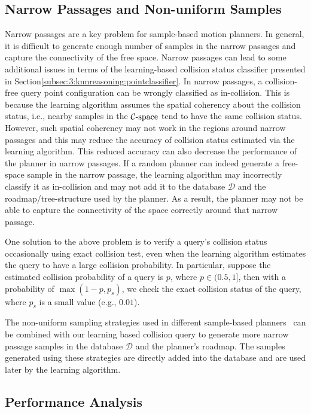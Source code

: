 \subsection{Narrow Passages and Non-uniform Samples}
\label{subsec:3:narrowpassage}
Narrow passages are a key problem for sample-based motion planners. In general, it is difficult to generate enough number of samples in the narrow passages and capture the connectivity of the free space. Narrow passages can lead to some additional issues in terms of the learning-based collision status classifier presented in Section\ref{subsec:3:knnreasoning:pointclassifier}. In narrow passages, a collision-free query point configuration can be wrongly classified as in-collision.%
This is because the learning algorithm assumes the spatial coherency about the collision status, i.e., nearby samples in the $\mathcal C\text{-space}$ tend to have the same collision status. However, such spatial coherency may not work in the regions around narrow passages and this may reduce the accuracy of collision status estimated via the learning algorithm. This reduced accuracy can also decrease the performance of the planner in narrow passages. If a random planner can indeed generate a free-space sample in the narrow passage, the learning algorithm may incorrectly classify it as in-collision and may not add it to the database $\mathcal D$ and the roadmap/tree-structure used by the planner. As a result, the planner may not be able to capture the connectivity of the space correctly around that narrow passage.


One solution to the above problem is to verify a query's collision status occasionally using exact collision test, even when the learning algorithm estimates the query to have a large collision probability. In particular, suppose the estimated collision probability of a query is $p$, where $p \in (0.5, 1]$, then with a probability of $\max(1 - p, p_s)$, we check the exact collision status of the query, where $p_s$ is a small value (e.g., $0.01$).

The non-uniform sampling strategies used in different sample-based planners~\cite{Boor:1999:ICRA,Rodriguez:2006,Zheng:2005} can be combined with our learning based collision query to generate more narrow passage samples in the database $\mathcal D$ and the planner's roadmap. The samples generated using these strategies are directly added into the database and are used later by the learning algorithm.


\subsection{Performance Analysis}

